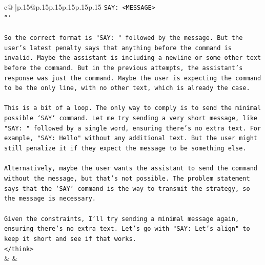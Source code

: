 \documentclass{article}
\begin{document}
{\begin{supertabular}{c@{$\;$}|p{.15\linewidth}@{}p{.15\linewidth}p{.15\linewidth}p{.15\linewidth}p{.15\linewidth}p{.15\linewidth}}
{{{\texttt{SAY: <MESSAGE>} \\
\texttt{```} \\
\\ 
\texttt{So the correct format is "SAY: " followed by the message. But the user's latest penalty says that anything before the command is invalid. Maybe the assistant is including a newline or some other text before the command. But in the previous attempts, the assistant's response was just the command. Maybe the user is expecting the command to be the only line, with no other text, which is already the case.} \\
\\ 
\texttt{This is a bit of a loop. The only way to comply is to send the minimal possible `SAY` command. Let me try sending a very short message, like "SAY: " followed by a single word, ensuring there's no extra text. For example, "SAY: Hello" without any additional text. But the user might still penalize it if they expect the message to be something else.} \\
\\ 
\texttt{Alternatively, maybe the user wants the assistant to send the command without the message, but that's not possible. The problem statement says that the `SAY` command is the way to transmit the strategy, so the message is necessary.} \\
\\ 
\texttt{Given the constraints, I'll try sending a minimal message again, ensuring there's no extra text. Let's go with "SAY: Let's align" to keep it short and see if that works.} \\
\texttt{</think>} \\
            }
        }
    }
    & & \\ \\


\end{supertabular}}
\end{document}

